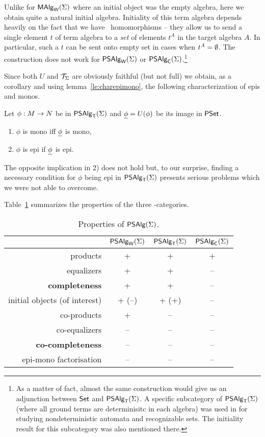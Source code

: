 \documentclass[10pt]{article}
\begin{document}
\noindent
Unlike for $\mbox{\rm\sf MAlg}_{\sf W}(\Sigma)$ where an initial object was the empty algebra, here
we obtain quite a natural initial algebra. Initiality of this term
algebra depends heavily on the fact that we have \PS\ homomorphisms --
they allow us to send a single element $t$ of term algebra to a {\em
set} of elements $t^A$ in the target algebra $A$. In particular, such
a $t$ can be sent onto empty set in cases when $t^A=\emptyset$.
The construction does not work for $\mbox{\sf PSAlg}_{\sf W}(\Sigma)$ or $\mbox{\sf PSAlg}_{\sf C}(\Sigma)$.\footnote{As a matter 
of fact, almost the same
construction would give us an adjunction between $\mbox{\rm\sf Set}$ and
$\mbox{\sf PSAlg}_{\sf T}(\Sigma)$. A specific subcategory of $\mbox{\sf PSAlg}_{\sf T}(\Sigma)$ (where all
ground terms are determinisitc in each algebra) was used in
\cite{eli:nondetaut} for studying nondeterministic automata and
recognizable sets. The initiality result for this subcategory was also
mentioned there.}

Since both $U$ and ${\cal T}_{\Sigma}$ are obviously
faithful (but not full) we obtain, as a corollary and using 
lemma~\ref{le:charepimono},
the following characterization of epis and monos.

\begin{Fact}
Let $\phi:M\rightarrow N$ be in $\mbox{\sf PSAlg}_{\sf T}(\Sigma)$ and $\underline {\phi}=U(\phi)$ be its
image in $\mbox{\rm\sf PSet}$.
\begin{enumerate}\MyLPar
\item $\phi$ is mono iff $\underline {\phi}$ is mono,
\item $\phi$ is epi if $\underline {\phi}$ is epi.
\end{enumerate}
\end{Fact}

\noindent
The opposite implication in 2) does not hold but, to our surprise, 
finding a necessary condition for $\phi$ being epi in $\mbox{\sf PSAlg}_{\sf T}(\Sigma)$ presents serious
problems which we were not able to overcome.

Table~\ref{tab:B} summarizes the properties of the three \PS-categories.

\begin{table}[htb] 
\begin{center}
\begin{tabular}{|r|c|c|c|}
\hline
    & $\mbox{\sf PSAlg}_{\sf W}(\Sigma)$ & $\mbox{\sf PSAlg}_{\sf T}(\Sigma)$ & $\mbox{\sf PSAlg}_{\sf C}(\Sigma)$ \\ \hline
products       &+ & +   & + \\
equalizers     &+ & +   & -- \\
{\bf completeness} &+ & +   & -- \\ \hline
initial objects (of interest) &+ (--) & + (+)  & -- \\
co-products    &+ & --  & -- \\
co-equalizers  &-- & --  & -- \\
{\bf co-completeness}&-- & -- & -- \\ \hline
epi-mono factorisation   &-- & --   & -- \\ \hline
\end{tabular}
\caption{Properties of $\mbox{\sf PSAlg}(\Sigma)$.}\label{tab:B}
\end{center} \vspace*{-4ex}
\end{table} 
\end{document}
